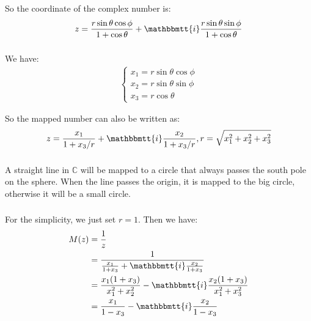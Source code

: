 \documentclass[]{ctexart}
\newcommand{\mi}{\mathbbmtt{i}}
\begin{document}
			So the coordinate of the complex number is: 
				\begin{equation*}
				\begin{aligned}
					z=\frac{r\sin\theta \cos \phi}{1+\cos\theta }+\mi\frac{r\sin\theta \sin \phi}{1+\cos\theta } 
				\end{aligned}
				\end{equation*}
			
			\subsubsection{}
				We have:
					\begin{equation*}
					\begin{aligned}
						\begin{cases}
							x_1=r\sin\theta \cos \phi\\
							x_2=r\sin\theta \sin \phi\\
							x_3=r\cos\theta
						\end{cases}
					\end{aligned}
					\end{equation*}
				
				So the mapped number can also be written as:
					\begin{equation*}
					\begin{aligned}
						z=\frac{x_1}{1+x_3/r}+\mi \frac{x_2}{1+x_3/r},r=\sqrt{x_1^2+x_2^2+x_3^2}
					\end{aligned}
					\end{equation*}
			
			\subsubsection{}
				A straight line in $\mathbb{C}$ will be mapped to a circle that always passes the south pole on the sphere. When the line passes the origin, it is mapped to the big circle, otherwise it will be a small circle. 
			
			\subsubsection{}
				For the simplicity, we just set $r=1$. Then we have:
					\begin{equation*}
					\begin{aligned}
						M(z)&=\frac{1}{z}\\
						&=\frac{1}{\frac{x_1}{1+x_3}+\mi \frac{x_2}{1+x_3}}\\
						&=\frac{x_1(1+x_3)}{x_1^2+x_2^2}-\mi \frac{x_2(1+x_3)}{x_1^2+x_3^2}\\
						&=\frac{x_1}{1-x_3}-\mi \frac{x_2}{1-x_3}
					\end{aligned}
					\end{equation*}
				
\end{document}
